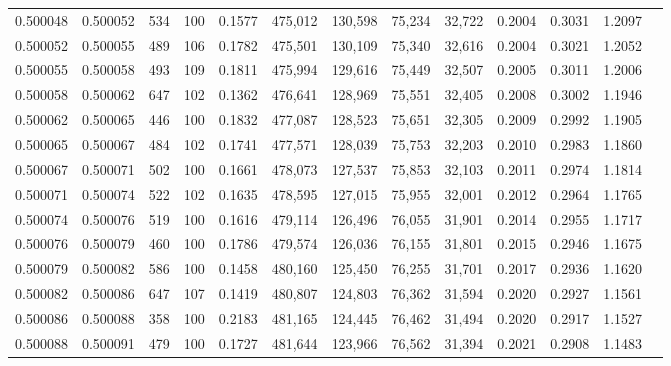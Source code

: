 \begin{tabular}{rrrrrrrrrrrrr}
0.500048 & 0.500052 &   534 & 100 &                                     0.1577 & 475,012 & 130,598 &  75,234 &  32,722 & 0.2004 & 0.3031 & 1.2097 \\
0.500052 & 0.500055 &   489 & 106 &                                     0.1782 & 475,501 & 130,109 &  75,340 &  32,616 & 0.2004 & 0.3021 & 1.2052 \\
0.500055 & 0.500058 &   493 & 109 &                                     0.1811 & 475,994 & 129,616 &  75,449 &  32,507 & 0.2005 & 0.3011 & 1.2006 \\
0.500058 & 0.500062 &   647 & 102 &                                     0.1362 & 476,641 & 128,969 &  75,551 &  32,405 & 0.2008 & 0.3002 & 1.1946 \\
0.500062 & 0.500065 &   446 & 100 &                                     0.1832 & 477,087 & 128,523 &  75,651 &  32,305 & 0.2009 & 0.2992 & 1.1905 \\
0.500065 & 0.500067 &   484 & 102 &                                     0.1741 & 477,571 & 128,039 &  75,753 &  32,203 & 0.2010 & 0.2983 & 1.1860 \\
0.500067 & 0.500071 &   502 & 100 &                                     0.1661 & 478,073 & 127,537 &  75,853 &  32,103 & 0.2011 & 0.2974 & 1.1814 \\
0.500071 & 0.500074 &   522 & 102 &                                     0.1635 & 478,595 & 127,015 &  75,955 &  32,001 & 0.2012 & 0.2964 & 1.1765 \\
0.500074 & 0.500076 &   519 & 100 &                                     0.1616 & 479,114 & 126,496 &  76,055 &  31,901 & 0.2014 & 0.2955 & 1.1717 \\
0.500076 & 0.500079 &   460 & 100 &                                     0.1786 & 479,574 & 126,036 &  76,155 &  31,801 & 0.2015 & 0.2946 & 1.1675 \\
0.500079 & 0.500082 &   586 & 100 &                                     0.1458 & 480,160 & 125,450 &  76,255 &  31,701 & 0.2017 & 0.2936 & 1.1620 \\
0.500082 & 0.500086 &   647 & 107 &                                     0.1419 & 480,807 & 124,803 &  76,362 &  31,594 & 0.2020 & 0.2927 & 1.1561 \\
0.500086 & 0.500088 &   358 & 100 &                                     0.2183 & 481,165 & 124,445 &  76,462 &  31,494 & 0.2020 & 0.2917 & 1.1527 \\
0.500088 & 0.500091 &   479 & 100 &                                     0.1727 & 481,644 & 123,966 &  76,562 &  31,394 & 0.2021 & 0.2908 & 1.1483 \\

\end{tabular}

